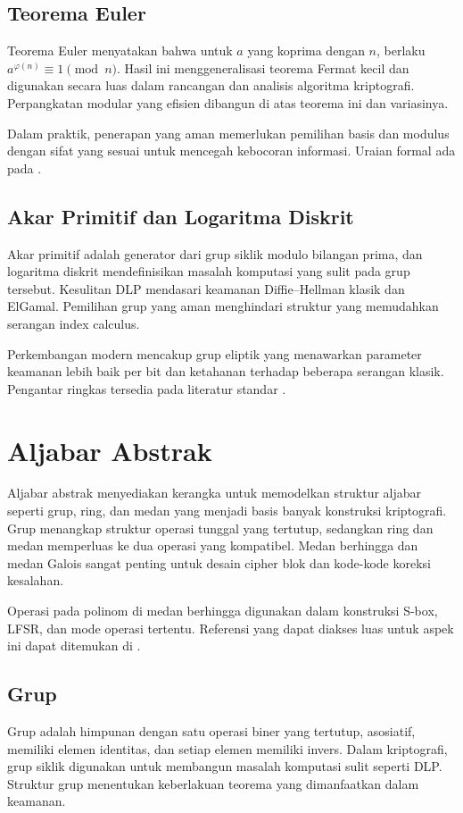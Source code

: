 \documentclass[../main.tex]{subfiles}
\begin{document}
\subsection{Teorema Euler}
Teorema Euler menyatakan bahwa untuk \(a\) yang koprima dengan \(n\), berlaku \(a^{\varphi(n)} \equiv 1 \pmod{n}\). Hasil ini menggeneralisasi teorema Fermat kecil dan digunakan secara luas dalam rancangan dan analisis algoritma kriptografi. Perpangkatan modular yang efisien dibangun di atas teorema ini dan variasinya.

Dalam praktik, penerapan yang aman memerlukan pemilihan basis dan modulus dengan sifat yang sesuai untuk mencegah kebocoran informasi. Uraian formal ada pada \textcite{menezes1996handbook}.

\subsection{Akar Primitif dan Logaritma Diskrit}
Akar primitif adalah generator dari grup siklik modulo bilangan prima, dan logaritma diskrit mendefinisikan masalah komputasi yang sulit pada grup tersebut. Kesulitan DLP mendasari keamanan Diffie--Hellman klasik dan ElGamal. Pemilihan grup yang aman menghindari struktur yang memudahkan serangan index calculus.

Perkembangan modern mencakup grup eliptik yang menawarkan parameter keamanan lebih baik per bit dan ketahanan terhadap beberapa serangan klasik. Pengantar ringkas tersedia pada literatur standar \parencite{menezes1996handbook,bonehshoup2020}.

\section{Aljabar Abstrak}
Aljabar abstrak menyediakan kerangka untuk memodelkan struktur aljabar seperti grup, ring, dan medan yang menjadi basis banyak konstruksi kriptografi. Grup menangkap struktur operasi tunggal yang tertutup, sedangkan ring dan medan memperluas ke dua operasi yang kompatibel. Medan berhingga dan medan Galois sangat penting untuk desain cipher blok dan kode-kode koreksi kesalahan.

Operasi pada polinom di medan berhingga digunakan dalam konstruksi S-box, LFSR, dan mode operasi tertentu. Referensi yang dapat diakses luas untuk aspek ini dapat ditemukan di \textcite{menezes1996handbook}.

\subsection{Grup}
Grup adalah himpunan dengan satu operasi biner yang tertutup, asosiatif, memiliki elemen identitas, dan setiap elemen memiliki invers. Dalam kriptografi, grup siklik digunakan untuk membangun masalah komputasi sulit seperti DLP. Struktur grup menentukan keberlakuan teorema yang dimanfaatkan dalam keamanan.
\end{document}
